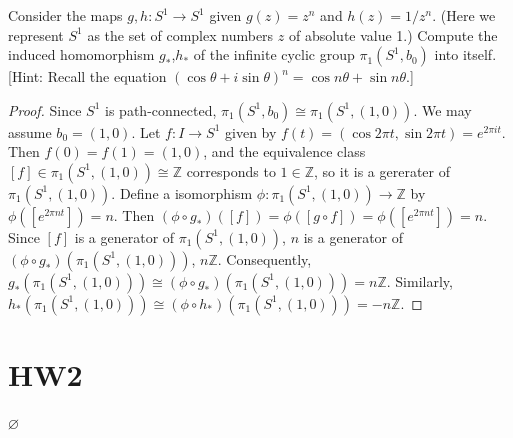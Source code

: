 \documentclass{article}
\begin{document}
\begin{multicols}{2}
\begin{exercise}
Consider the maps $g,h:S^1\to S^1$ given $g(z)=z^n$ and $h(z)=1/z^n$. (Here we represent $S^1$ as the set of complex numbers $z$ of absolute value 1.) Compute the induced homomorphism $g_*$,$h_*$ of the infinite cyclic group $\pi_1(S^1,b_0)$ into itself. [Hint: Recall the equation $(\cos \theta + i\sin \theta)^n = \cos n\theta + \sin n\theta$.]
\end{exercise}
\begin{proof}
Since $S^1$ is path-connected, $\pi_1(S^1,b_0)\cong \pi_1(S^1,(1,0))$. We may assume $b_0=(1,0)$. Let $f:I\to S^1$ given by $f(t)=(\cos 2\pi t, \sin 2\pi t) = e^{2\pi it}$. Then $f(0) = f(1) = (1,0)$, and the equivalence class $[f]\in \pi_1(S^1,(1,0))\cong \mathbb{Z}$ corresponds to $1\in \mathbb{Z}$, so it is a gererater of $\pi_1(S^1,(1,0))$. Define a isomorphism $\phi:\pi_1(S^1,(1,0))\to \mathbb{Z}$ by $\phi([e^{2\pi nt}])=n$. Then $(\phi \circ g_*)([f]) = \phi([g\circ f])=\phi([e^{2\pi nt}])=n$. Since $[f]$ is a generator of $\pi_1(S^1,(1,0))$, $n$ is a generator of $(\phi \circ g_*)(\pi_1(S^1,(1,0)))$, $n \mathbb{Z}$. Consequently, $g_*(\pi_1(S^1,(1,0)))\cong (\phi \circ g_*)(\pi_1(S^1,(1,0))) = n \mathbb{Z}$. Similarly, $h_*(\pi_1(S^1,(1,0))) \cong (\phi \circ h_*)(\pi_1(S^1,(1,0))) = -n \mathbb{Z}$.
\end{proof}

\clearpage

\section{HW2}
$\varnothing$


\end{multicols}
\end{document}
